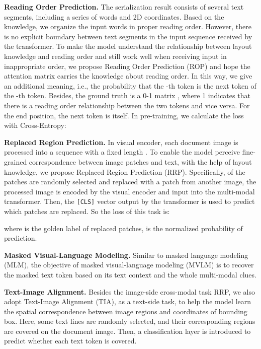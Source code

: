 \documentclass[11pt]{article}
\begin{document}
\noindent\textbf{Reading Order Prediction.}
The serialization result consists of several text segments, including a series of words and 2D coordinates. Based on the knowledge, we organize the input words in proper reading order. 
However, there is no explicit boundary between text segments in the input sequence received by the transformer. 
To make the model understand the relationship between layout knowledge and reading order and still work well when receiving input in inappropriate order, we propose Reading Order Prediction (ROP) and hope the attention matrix  carries the knowledge about reading order.
In this way, we give  an additional meaning, i.e., the probability that the -th token is the next token of the -th token.
Besides, the ground truth is a 0-1 matrix , where 1 indicates that there is a reading order relationship between the two tokens and vice versa. For the end position, the next token is itself.
In pre-training, we calculate the loss with Cross-Entropy:


\noindent\textbf{Replaced Region Prediction.}
In visual encoder, each document image is processed into a sequence with a fixed length .
To enable the model perceive fine-grained correspondence between image patches and text, with the help of layout knowledge, we propose Replaced Region Prediction (RRP).
Specifically,  of the patches are randomly selected and replaced with a patch from another image, the processed image is encoded by the visual encoder and input into the multi-modal transformer. 
Then, the \verb|[CLS]| vector output by the transformer is used to predict which patches are replaced. 
So the loss of this task is:

where  is the golden label of replaced patches,  is the normalized probability of prediction.

\noindent\textbf{Masked Visual-Language Modeling.}
Similar to masked language modeling (MLM), the objective of masked visual-language modeling (MVLM) is to recover the masked text token based on its text context and the whole multi-modal clues.

\noindent\textbf{Text-Image Alignment.} 
Besides the image-side cross-modal task RRP, we also adopt Text-Image Alignment (TIA), as a text-side task, to help the model learn the spatial correspondence between image regions and coordinates of bounding box.
Here, some text lines are randomly selected, and their corresponding regions are covered on the document image.
Then, a classification layer is introduced to predict whether each text token is covered.
\end{document}
